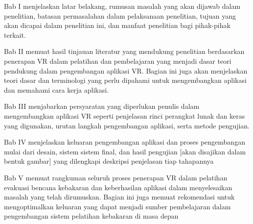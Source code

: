 Bab I menjelaskan latar belakang, rumusan masalah yang akan dijawab dalam penelitian, batasan permasalahan dalam pelaksanaan penelitian, tujuan yang akan dicapai dalam penelitian ini, dan manfaat penelitian bagi pihak-pihak terkait.

Bab II memuat hasil tinjauan literatur yang mendukung penelitian berdasarkan penerapan VR dalam pelatihan dan pembelajaran yang menjadi dasar teori pendukung dalam pengembangan aplikasi VR. Bagian ini juga akan menjelaskan teori dasar dan terminologi yang perlu dipahami untuk mengembangkan aplikasi dan memahami cara kerja aplikasi.

Bab III menjabarkan persyaratan yang diperlukan penulis dalam mengembangkan aplikasi VR seperti penjelasan rinci perangkat lunak dan keras yang digunakan, urutan langkah pengembangan aplikasi, serta metode pengujian.

Bab IV menjelaskan keluaran pengembangan aplikasi dan proses pengembangan mulai dari desain, sistem sistem final, dan hasil pengujian [akan disajikan dalam bentuk gambar] yang dilengkapi deskripsi penjelasan tiap tahapannya

Bab V memuat rangkuman seluruh proses penerapan VR dalam pelatihan evakuasi bencana kebakaran dan keberhasilan aplikasi dalam menyelesaikan masalah yang telah dirumuskan. Bagian ini juga memuat rekomendasi untuk mengoptimalkan keluaran yang dapat menjadi sumber pembelajaran dalam pengembangan sistem pelatihan kebakaran di masa depan
